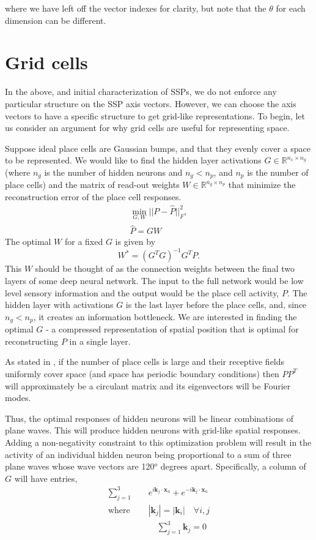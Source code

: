 \documentclass[10pt,letterpaper,oneside]{article}
\begin{document}
where we have left off the vector indexes for clarity, but note that the $\theta$ for each dimension can be different.

\section{Grid cells}
In the above, and initial characterization of SSPs, we do not enforce any particular structure on the SSP axis vectors. However, we can choose the axis vectors to have a specific structure to get grid-like representations. To begin, let us consider an argument for why grid cells are useful for representing space.

Suppose ideal place cells are Gaussian bumps, and that they evenly cover a space to be represented. We would like to find the hidden layer activations $G \in \mathbb{R}^{n_x \times n_g}$ (where $n_g$ is the number of hidden neurons and $n_g < n_p$, and $n_p$ is the number of place cells) and the matrix of read-out weights $W \in \mathbb{R}^{n_g \times n_p}$ that minimize the reconstruction error of the place cell responses.
\begin{align}
\min_{G,W} || P - \hat{P} ||_{F}^2, \\ \hat{P} = GW
\end{align}
The optimal $W$ for a fixed $G$ is given by
\begin{equation} \label{eqn:optimReadOutWeight}
W^* = (G^T G)^{-1} G^T P.
\end{equation}
This $W$ should be thought of as the connection weights between the final two layers of some deep neural network. The input to the full network would be low level sensory information and the output would be the place cell activity, $P$. The hidden layer with activations $G$ is the last layer before the place cells, and, since $n_g < n_p$, it creates an information bottleneck. We are interested in finding the optimal $G$ - a compressed representation of spatial position that is optimal for reconstructing $P$ in a single layer.

As stated in \cite{sorscher2019unified}, if the number of place cells is large and their receptive fields uniformly cover space (and space has periodic boundary conditions) then $PP^T$ will approximately be a circulant matrix and its eigenvectors will be Fourier modes.

Thus, the optimal responses of hidden neurons will be linear combinations of plane waves. This will produce hidden neurons with grid-like spatial responses. Adding a non-negativity constraint to this optimization problem will result in the activity of an individual hidden neuron being proportional to a sum of three plane waves whose wave vectors are 120$^o$ degrees apart. Specifically, a column of $G$ will have entries,
\begin{align}
     \sum_{j=1}^{3} & e^{i \mathbf{k}_j \cdot \mathbf{x}_n } + e^{-i \mathbf{k}_j \cdot \mathbf{x}_n  } \label{eqn:planewavesum} \\
    \text{where } \quad & |\mathbf{k}_j| = |\mathbf{k}_i| \quad \forall i,j \\
    & \quad \sum_{j=1}^{3} \mathbf{k}_j = 0
\end{align}
\end{document}
